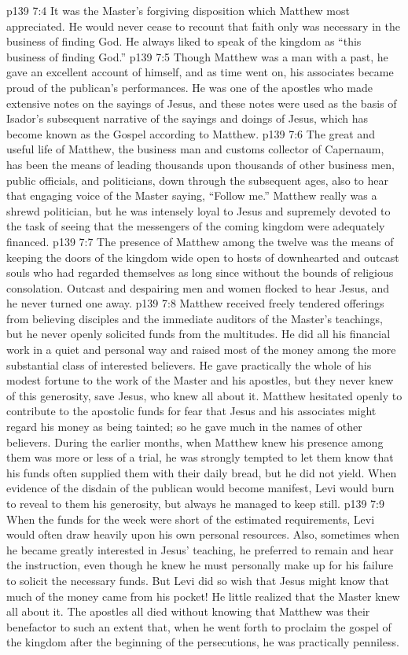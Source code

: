 \vs p139 7:4 It was the Master’s forgiving disposition which Matthew most appreciated. He would never cease to recount that faith only was necessary in the business of finding God. He always liked to speak of the kingdom as “this business of finding God.”
\vs p139 7:5 \pc Though Matthew was a man with a past, he gave an excellent account of himself, and as time went on, his associates became proud of the publican’s performances. He was one of the apostles who made extensive notes on the sayings of Jesus, and these notes were used as the basis of Isador’s subsequent narrative of the sayings and doings of Jesus, which has become known as the Gospel according to Matthew.
\vs p139 7:6 The great and useful life of Matthew, the business man and customs collector of Capernaum, has been the means of leading thousands upon thousands of other business men, public officials, and politicians, down through the subsequent ages, also to hear that engaging voice of the Master saying, “Follow me.” Matthew really was a shrewd politician, but he was intensely loyal to Jesus and supremely devoted to the task of seeing that the messengers of the coming kingdom were adequately financed.
\vs p139 7:7 The presence of Matthew among the twelve was the means of keeping the doors of the kingdom wide open to hosts of downhearted and outcast souls who had regarded themselves as long since without the bounds of religious consolation. Outcast and despairing men and women flocked to hear Jesus, and he never turned one away.
\vs p139 7:8 \pc Matthew received freely tendered offerings from believing disciples and the immediate auditors of the Master’s teachings, but he never openly solicited funds from the multitudes. He did all his financial work in a quiet and personal way and raised most of the money among the more substantial class of interested believers. He gave practically the whole of his modest fortune to the work of the Master and his apostles, but they never knew of this generosity, save Jesus, who knew all about it. Matthew hesitated openly to contribute to the apostolic funds for fear that Jesus and his associates might regard his money as being tainted; so he gave much in the names of other believers. During the earlier months, when Matthew knew his presence among them was more or less of a trial, he was strongly tempted to let them know that his funds often supplied them with their daily bread, but he did not yield. When evidence of the disdain of the publican would become manifest, Levi would burn to reveal to them his generosity, but always he managed to keep still.
\vs p139 7:9 When the funds for the week were short of the estimated requirements, Levi would often draw heavily upon his own personal resources. Also, sometimes when he became greatly interested in Jesus’ teaching, he preferred to remain and hear the instruction, even though he knew he must personally make up for his failure to solicit the necessary funds. But Levi did so wish that Jesus might know that much of the money came from his pocket! He little realized that the Master knew all about it. The apostles all died without knowing that Matthew was their benefactor to such an extent that, when he went forth to proclaim the gospel of the kingdom after the beginning of the persecutions, he was practically penniless.
